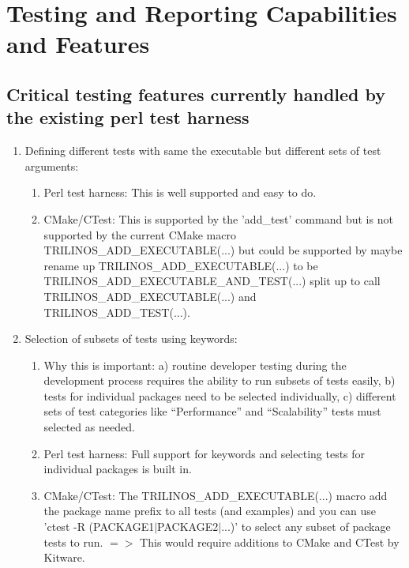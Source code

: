 \documentclass[pdf,ps2pdf,11pt]{SANDreport}
\begin{document}
%
\section{Testing and Reporting Capabilities and Features}
%


%
{}\subsection{Critical testing features currently handled by the
existing perl test harness}
%

\begin{enumerate}

{}\item Defining different tests with same the executable but
different sets of test arguments:

  \begin{enumerate}

  {}\item Perl test harness: This is well supported and easy to do.

  {}\item CMake/CTest: This is supported by the 'add\_test' command
  but is not supported by the current CMake macro
  TRILINOS\_ADD\_EXECUTABLE(...) but could be supported by maybe
  rename up TRILINOS\_ADD\_EXECUTABLE(...) to be
  TRILINOS\_ADD\_EXECUTABLE\_AND\_TEST(...) split up to call
  TRILINOS\_ADD\_EXECUTABLE(...) and TRILINOS\_ADD\_TEST(...).

  \end{enumerate}

{}\item Selection of subsets of tests using keywords:

  \begin{enumerate}

  {}\item Why this is important: a) routine developer testing during
  the development process requires the ability to run subsets of tests
  easily, b) tests for individual packages need to be selected
  individually, c) different sets of test categories like
  ``Performance'' and ``Scalability'' tests must selected as needed.

  {}\item Perl test harness: Full support for keywords and selecting
  tests for individual packages is built in.

  {}\item CMake/CTest: The TRILINOS\_ADD\_EXECUTABLE(...) macro add
  the package name prefix to all tests (and examples) and you can
  use 'ctest -R (PACKAGE1$|$PACKAGE2$|$...)' to select any subset of
  package tests to run. $=>$ This would require additions to CMake
  and CTest by Kitware.


\end{enumerate}
\end{enumerate}
\end{document}
